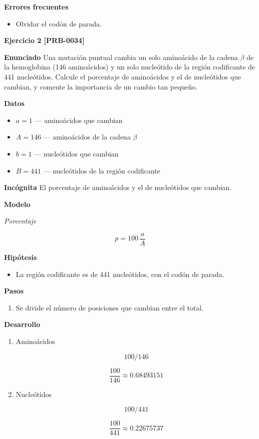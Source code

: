 \documentclass{book}
\begin{document}
\noindent\textbf{Errores frecuentes}
\begin{itemize}
\item Olvidar el codón de parada.
\end{itemize}

\noindent\textbf{Ejercicio 2 [PRB-0034]}

\noindent\textbf{Enunciado}
Una mutación puntual cambia un solo aminoácido de la cadena \(\beta\) de la hemoglobina (146 aminoácidos) y un solo nucleótido de la región codificante de 441 nucleótidos. Calcule el porcentaje de aminoácidos y el de nucleótidos que cambian, y comente la importancia de un cambio tan pequeño.


\noindent\textbf{Datos}
\begin{itemize}
\item $a = 1$ — aminoácidos que cambian
\item $A = 146$ — aminoácidos de la cadena \(\beta\)
\item $b = 1$ — nucleótidos que cambian
\item $B = 441$ — nucleótidos de la región codificante
\end{itemize}

\noindent\textbf{Incógnita}
El porcentaje de aminoácidos y el de nucleótidos que cambian.


\noindent\textbf{Modelo}

\noindent\textit{Porcentaje}

\[
p = 100\,\frac{a}{A}
\]

\noindent\textbf{Hipótesis}
\begin{itemize}
\item La región codificante es de 441 nucleótidos, con el codón de parada.
\end{itemize}

\noindent\textbf{Pasos}
\begin{enumerate}
\item
Se divide el número de posiciones que cambian entre el total.

\end{enumerate}

\noindent\textbf{Desarrollo}
\begin{enumerate}
\item
Aminoácidos


\[
100/146
\]

\[
\frac{100}{146} \approx 0.68493151
\]
\item
Nucleótidos


\[
100/441
\]

\[
\frac{100}{441} \approx 0.22675737
\]
\end{enumerate}
\end{document}
